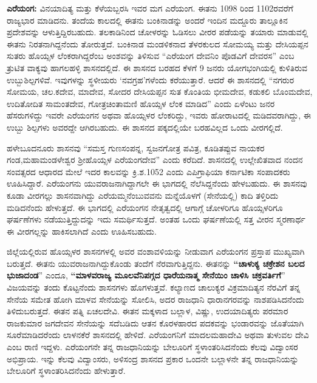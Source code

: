 \textbf{ಎರೆಯಂಗ:} ವಿನಯಾದಿತ್ಯ ಮತ್ತು ಕೆಳೆಯಬ್ಬರಸಿ ಇವರ ಮಗ ಎರೆಯಂಗ. ಈತನು 1098 ರಿಂದ 1102ರವರೆಗೆ ರಾಜ್ಯಭಾರ ಮಾಡಿದನು. ತಂದೆಯ ಕಾಲದಲ್ಲಿ ಈತನು ಬಂಕಿನಾಡನ್ನು ಅಂದರೆ ಇಂದಿನ ಮದ್ದೂರು ತಾಲ್ಲೂಕಿನ ಪ್ರದೇಶವನ್ನು ಆಳುತ್ತಿದ್ದಿರಬಹುದು. ತಲಕಾಡಿನಿಂದ ಚೋಳರನ್ನು ಓಡಿಸಲು ವೀರರ ಪಡೆಯನ್ನು ತಯಾರು ಮಾಡುವಲ್ಲಿ ಈತನು ನಿರತನಾಗಿದ್ದನೆಂದು ತೋರುತ್ತದೆ. ಬಂಕಿನಾಡ ಮಂಡಳಿಕನಾದ ತೆಳರಕುಲದ ಸೋಮಯ್ಯ ಮತ್ತು ದೇಸಿಯಪ್ಪನ ಸುತರು ಹೊಯ್ಸಳ ಲೆಂಕರಾಗಿದ್ದರೆಂಬ ಅಂಶವನ್ನು ತಿಳಿಸುವ “ಎರೆಯಂಗ ದೇವನಿಂ ಪೊಡವಿಗೆ ದೇವರಸ” ಎಂಬ ತ್ರುಟಿತ ವಾಕ್ಯವು ಹಾಗಲಹಳ್ಳಿ ಶಾಸನದಲ್ಲಿದೆ. ಈ ಶಾಸನದ ಬರಹದ ಕೆಳಗೆ 9 ಜನರು ಯೋಗಭಂಗಿಯಲ್ಲಿ ಕುಳಿತಿರುವ ಉಬ್ಬುಶಿಲ್ಪಗಳಿವೆ. ಇವುಗಳನ್ನು ಸ್ಥಳೀಯರು ‘ನವಗ್ರಹ’ಗಳೆಂದು ಕರೆಯುತ್ತಾರೆ. ಆದರೆ ಈ ಶಾಸನದಲ್ಲಿ “ನಗರುರ ಸೋಮಯ, ಚಲ.ಕದೇವ, ಮಾದೇವ, ಸೋದರ ದೇಸಿಯಪ್ಪನ ಸುತ ಕೊಂತಿಯ ಭೀಮದೇವ, ಕಡುಕಲಿ ಬೊಂಮದೇವ, ಉದಿತೋದಿತ ಸಾಮಂತದೇವ, ಗೋತ್ರಚಿಂತಾಮಣಿ ಹೊಯ್ಸಳ ಲೆಂಕ ಮಾಡಿದ” ಎಂದು ಏಳೆಂಟು ಜನರ ಹೆಸರುಗಳಿದ್ದು ಇವರೇ ಎರೆಯಂಗನ ಅಥವಾ ಹೊಯ್ಸಳರ ಲೆಂಕರಿದ್ದು, ಇವರು ಹೋರಾಟದಲ್ಲಿ ಮಡಿದವರಾಗಿದ್ದು, ಈ ಉಬ್ಬು ಶಿಲ್ಪಗಳು ಅವರದ್ದೇ ಆಗಿರಬಹುದು. ಈ ಶಾಸನದ ಪಕ್ಕದಲ್ಲಿಯೇ ಬರಹವಿಲ್ಲದ ಒಂದು ವೀರಗಲ್ಲಿದೆ. 

ಹಳೇಬೂದನೂರು ಶಾಸನವು “ಸಮಸ್ತ ಗುಣಸಂಪನ್ನ, ಸ್ವಜನಗೋತ್ರ ಪವಿತ್ರ, ಕೂಡಿತಪ್ಪುವ ನಾಯಕರ ಗಂಡ,\break ಮಹಾಮಂಡಳೇಶ್ವರ ಶ‍್ರೀಹೊಯ್ಸಳ ಎರೆಯಂಗದೇವ” ಎಂದು ಕರೆದಿದೆ. ಶಾಸನದಲ್ಲಿ ಉಲ್ಲೇಖಿತವಾದ ನಂದನ ಸಂವತ್ಸರದ ಆಧಾರದ ಮೇಲೆ ಇದರ ಕಾಲವನ್ನು ಕ್ರಿ.ಶ.1052 ಎಂದು ಎಪಿಗ್ರಾಫಿಯಾ ಕರ್ನಾಟಿಕಾ ಸಂಪಾದಕರು ಊಹಿಸಿದ್ದಾರೆ. ಎರೆಯಂಗನು ಯುವರಾಜನಾಗಿದ್ದಾಗಲೇ ಈ ಭಾಗದಲ್ಲಿ ನೆಲೆಸಿದ್ದನೆಂದು ಹೇಳಬಹುದು. ಈ ಶಾಸನವು ಕೂಡಾ ವೀರಗಲ್ಲು ಶಾಸನವಾಗಿದ್ದು ಎರೆಯಮ್ಮನೆಂಬುವವನು ಮನ್ನೆಯೊಳಗೆ (ಸೇನೆಯಲ್ಲಿ) ಕಾದಿ ತಳ್ತಿರಿದು ಮಡಿದನೆಂದು ಹೇಳುತ್ತದೆ. ಈ ಭಾಗದಲ್ಲಿ ಎರೆಯಂಗನ ನೇತೃತ್ವದಲ್ಲಿ ಆಗಾಗ್ಗೆ ಚೋಳರಿಗೂ ಹೊಯ್ಸಳರಿಗೂ ಘರ್ಷಣೆಗಳು ನಡೆಯುತ್ತಿದ್ದುದನ್ನು ಇದು ಸಮರ್ಥಿಸುತ್ತದೆ. ಅಂತಹ ಒಂದು ಘರ್ಷಣೆಯಲ್ಲಿ ಸತ್ತ ವೀರನ ಸ್ಮರಣಾರ್ಥ ಈ ವೀರಗಲ್ಲನ್ನು ಹಾಕಿಸಲಾಗಿದೆ ಎಂದು ಊಹಿಸಬಹುದು. 

ಜಿಲ್ಲೆಯಲ್ಲಿರುವ ಹೊಯ್ಸಳರ ಶಾಸನಗಳಲ್ಲಿ ಅವರ ವಂಶಾವಳಿಯನ್ನು ನೀಡುವಾಗ ಎರೆಯಂಗನ ಪ್ರಸ್ತಾಪ ಮುಖ್ಯವಾಗಿ ಬರುತ್ತದೆ. ಈತನು ಯುವರಾಜನಾಗಿದ್ದುಕೊಂಡು ತಂದೆಗೆ ನೆರವಾಗುತ್ತಿದ್ದನು. ಈತನನ್ನು \textbf{“ಚಾಳುಕ್ಯ ಚಕ್ರೇಶನ ಬಲದ ಭುಜಾದಂಡ}” ಎಂದೂ,\textbf{ “ಮಾಳವರಾಜ್ಯ ಮೂಲವೆನಿಪಗ್ಗದ ಧಾರೆಯನಾತ್ಮ ಸೇನೆಯಿಂ ಚಾಳಿಸಿ ಚಕ್ರವರ್ತಿಗೆ}” ವಿಜಯವನ್ನು ತಂದು ಕೊಟ್ಟನೆಂದು ಶಾಸನಗಳು ಹೊಗಳುತ್ತವೆ. ಕಲ್ಯಾಣದ ಚಾಲುಕ್ಯರ ವಿಕ್ರಮಾದಿತ್ಯನ ನೆರವಿಗೆ ತನ್ನ ಸೇನೆಯ ಸಮೇತ ಹೋಗಿ ಮಾಳವ ಸೇನೆಯನ್ನು ಸೋಲಿಸಿ, ಅದರ ರಾಜಧಾನಿ ಧಾರಾನಗರವನ್ನು ನಾಶಪಡಿಸಿದನೆಂದು ತಿಳಿದುಬರುತ್ತದೆ. ಈತನ ಪತ್ನಿ ಏಚಲದೇವಿ. ಈತನ ಮಕ್ಕಳಾದ ಬಲ್ಲಾಳ, ವಿಷ್ಣು, ಉದಯಾದಿತ್ಯರು ಪರಮಾರ ರಾಜಕುಮಾರ ಜಗದೇವನ ಸೇನೆಯನ್ನು ಸದೆಬಡಿದು ಆತನ ಕೊರಳಹಾರದ ಪದಕವನ್ನು ಭಂಡಾರವನ್ನು ಜೊತೆಯಾಗಿ ಸೂರೆಮಾಡಿದರೆಂದು ಲಾಳನಕೆರೆ ಶಾಸನದಲ್ಲಿ ಹೇಳಿದೆ. ಎರೆಯಂಗನಿಗೆ ಮಾದಲಮಹಾದೇವಿ ಅಥವಾ ತುಳುವಲ ದೇವಿ ಎಂಬ ರಾಣಿ ಇದ್ದಳು. ಎರೆಯಂಗನೇ ತನ್ನ ರಾಜಧಾನಿಯನ್ನು ಬೇಲೂರಿಗೆ ಸ್ಥಳಾಂತರಿಸಿದನೆಂದು ಕೆಲವು ವಿದ್ವಾಂಸರ ಅಭಿಪ್ರಾಯ. ಇನ್ನು ಕೆಲವು ವಿದ್ವಾಂಸರು, ಅಳಿಸಂದ್ರ ಶಾಸನದ ಪ್ರಕಾರ ಒಂದನೇ ಬಲ್ಲಾಳನೇ ತನ್ನ ರಾಜಧಾನಿಯನ್ನು ಬೇಲೂರಿಗೆ ಸ್ಥಳಾಂತರಿಸಿದನೆಂದು ಹೇಳುತ್ತಾರೆ.

